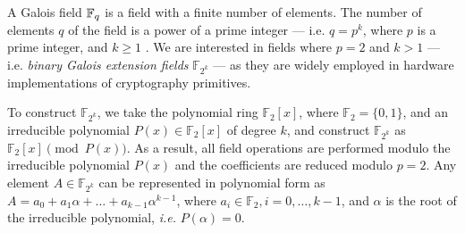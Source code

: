 


A Galois field ${\mathbb{F}}_{q}$ is a field with a finite number of elements. The
number of elements $q$ of the field is a power of a prime integer ---
i.e. $q = p^k$, where $p$ is a prime integer, and $k \geq 1$
\cite{galois_field:mceliece}. 
We are interested in fields where $p = 2$ and $k >1$ --- i.e. {\it
  binary Galois extension   fields} $\mathbb{F}_{2^k}$ --- as they are
widely employed in hardware implementations of cryptography
primitives.  

To construct ${\mathbb{F}}_{2^k}$, we take the polynomial ring
${\mathbb{F}}_2[x]$, where ${\mathbb{F}}_{2} = \{0, 1\}$, and an
irreducible  polynomial $P(x) \in {\mathbb{F}}_2[x]$ of degree $k$, and
construct ${\mathbb{F}}_{2^k}$ as ${\mathbb{F}}_2[x] \pmod{   P(x)}$. As a
result, all field operations are performed 
modulo the irreducible polynomial $P(x)$ and the coefficients are
reduced modulo $p=2$. %
Any element $A \in {\mathbb{F}}_{2^k}$ can be represented in polynomial
form as $A = a_0 +  a_1 \alpha + \dots + a_{k-1} \alpha^{k-1}$, where
$a_i \in {\mathbb{F}}_2, i = 0, \dots, k-1$, and $\alpha$ is the root of
the irreducible polynomial, {\it i.e.} $P(\alpha)=0$. 



